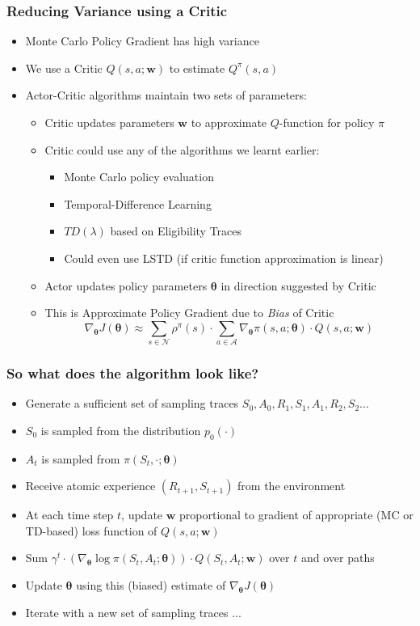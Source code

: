 \documentclass[handout]{beamer}
\begin{document}
\begin{frame}
\frametitle{Reducing Variance using a Critic}
\pause
\begin{itemize}[<+->]
\item Monte Carlo Policy Gradient has high variance
\item We use a Critic $Q(s,a; \bm{w})$ to estimate $Q^{\pi}(s,a)$
\item Actor-Critic algorithms maintain two sets of parameters:
\begin{itemize}
\item Critic updates parameters $\bm{w}$ to approximate $Q$-function for policy $\pi$
\item Critic could use any of the algorithms we learnt earlier:
\begin{itemize}
\item Monte Carlo policy evaluation
\item Temporal-Difference Learning
\item $TD(\lambda)$ based on Eligibility Traces
\item Could even use LSTD (if critic function approximation is linear)
\end{itemize}
\item Actor updates policy parameters $\bm{\theta}$ in direction suggested by Critic
\item This is Approximate Policy Gradient due to {\em Bias} of Critic
$$ \nabla_{\bm{\theta}} J(\bm{\theta}) \approx \sum_{s \in \mathcal{N}} \rho^{\pi}(s) \cdot \sum_{a \in \mathcal{A}} \nabla_{\bm{\theta}} \pi(s, a; \bm{\theta}) \cdot Q(s,a; \bm{w}) $$
\end{itemize}
\end{itemize}
\end{frame}

\begin{frame}
\frametitle{So what does the algorithm look like?}
\pause
\begin{itemize}[<+->]
\item Generate a sufficient set of sampling traces $S_0,A_0,R_1,S_1,A_1,R_2,S_2\ldots$
\item $S_0$ is sampled from the distribution $p_0(\cdot)$
\item $A_t$ is sampled from $\pi(S_t,\cdot; \bm{\theta})$
\item Receive atomic experience $(R_{t+1}, S_{t+1})$ from the environment
\item At each time step $t$, update $\bm{w}$ proportional to gradient of appropriate (MC or TD-based) loss function of $Q(s,a;\bm{w})$
\item Sum $\gamma^t \cdot (\nabla_{\bm{\theta}} \log \pi(S_t,A_t; \bm{\theta})) \cdot Q(S_t,A_t; \bm{w})$ over $t$ and over paths
\item Update $\bm{\theta}$ using this (biased) estimate of $\nabla_{\bm{\theta}} J(\bm{\theta})$
\item Iterate with a new set of sampling traces ...
\end{itemize}
\end{frame}
\end{document}
